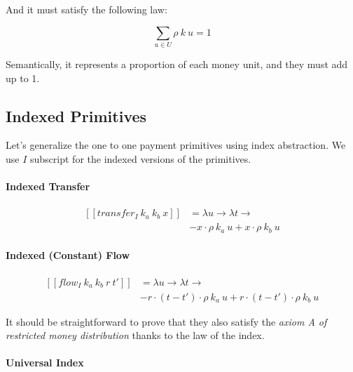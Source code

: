 And it must satisfy the following law:

\begin{equation}
    \displaystyle \sum_{u \in U} \rho\ k\ u = 1
\end{equation}

Semantically, it represents a proportion of each money unit, and they must add up to 1.

\subsection{Indexed Primitives}

Let's generalize the one to one payment primitives using index abstraction. We use $I$ subscript for
the indexed versions of the primitives.

\paragraph{Indexed Transfer}

\begin{equation}
    \begin{split}
        [\![transfer_I\ k_a\ k_b\ x]\!] &=
        \lambda u \rightarrow \lambda t \rightarrow \\
        &-x \cdot \rho\ k_a\ u + x \cdot \rho\ k_b\ u
    \end{split}
\end{equation}

\paragraph{Indexed (Constant) Flow}

\begin{equation}
    \begin{split}
        [\![flow_I\ k_a\ k_b\ r\ t']\!] &=
        \lambda u \rightarrow \lambda t \rightarrow \\
        &-r \cdot (t - t') \cdot \rho\ k_a\ u + r \cdot (t - t') \cdot \rho\ k_b\ u
    \end{split}
\end{equation}

It should be straightforward to prove that they also satisfy the \textit{axiom A of restricted money
distribution} thanks to the law of the index.

\paragraph{Universal Index}

